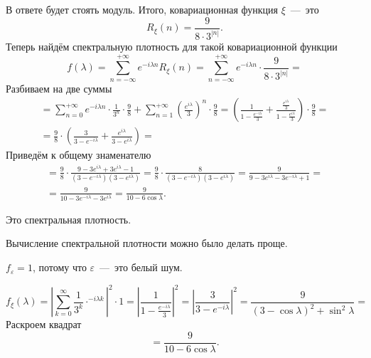 В ответе будет стоять модуль.
Итого, ковариационная функция $ \xi $~---~это
\begin{equation*}
  R_{ \xi } \left( n \right) =
  \frac{9}{8 \cdot 3^{ \left| n \right| }}.
\end{equation*}
Теперь найдём спектральную плотность для такой ковариационной функции
\begin{equation*}
  f \left( \lambda \right) =
  \sum \limits_{n = -\infty }^{+\infty } e^{-i \lambda n} R_{ \xi } \left( n \right) =
  \sum \limits_{n = -\infty }^{+\infty }
    e^{-i \lambda n} \cdot \frac{9}{8 \cdot 3^{ \left| n \right| }} =
\end{equation*}
Разбиваем на две суммы
\begin{gather*}
  = \sum \limits_{n = 0}^{+\infty } e^{-i \lambda n} \cdot \frac{1}{3^n} \cdot \frac{9}{8} +
  \sum \limits_{n = 1}^{+\infty } \left( \frac{e^{i \lambda }}{3} \right)^n \cdot \frac{9}{8} =
  \left(
    \frac{1}{1 - \frac{e^{-i \lambda }}{3}} +
    \frac{ \frac{e^{i \lambda }}{3}}{1 - \frac{e^{i \lambda }}{3}}
  \right) \cdot \frac{9}{8} = \\
  = \frac{9}{8} \cdot
  \left( \frac{3}{3 - e^{-i \lambda }} + \frac{e^{i \lambda }}{3 - e^{i \lambda }} \right) =
\end{gather*}
Приведём к общему знаменателю
\begin{gather*}
  = \frac{9}{8} \cdot
  \frac{9 - 3e^{i \lambda } + 3e^{i \lambda } - 1}{ \left( 3 - e^{-i \lambda } \right) \left( 3 - e^{i \lambda } \right) } =
  \frac{9}{8} \cdot
  \frac{8}{ \left( 3 - e^{-i \lambda } \right) \left( 3 - e^{i \lambda } \right) } =
  \frac{9}{9 - 3e^{i \lambda } - 3e^{-i \lambda } + 1} = \\
  = \frac{9}{10 - 3e^{-i \lambda } - 3e^{i \lambda }} =
  \frac{9}{10 - 6 \cos \lambda }.
\end{gather*}

Это спектральная плотность.

Вычисление спектральной плотности можно было делать проще.

$f_{ \varepsilon } = 1$, потому что $ \varepsilon $~---~это белый шум.

\begin{equation*}
  f_{ \xi } \left( \lambda \right) =
  \left| \sum \limits_{k = 0}^{ \infty } \frac{1}{3^k} \cdot ^{-i \lambda k} \right|^2 \cdot 1 =
  \left| \frac{1}{1 - \frac{e^{-i \lambda }}{3}} \right|^2 =
  \left| \frac{3}{3 - e^{-i \lambda }} \right|^2 =
  \frac{9}{ \left( 3 - \cos \lambda \right)^2 + \sin^2 \lambda } =
\end{equation*}
Раскроем квадрат
\begin{equation*}
  = \frac{9}{10 - 6 \cos \lambda }.
\end{equation*}

